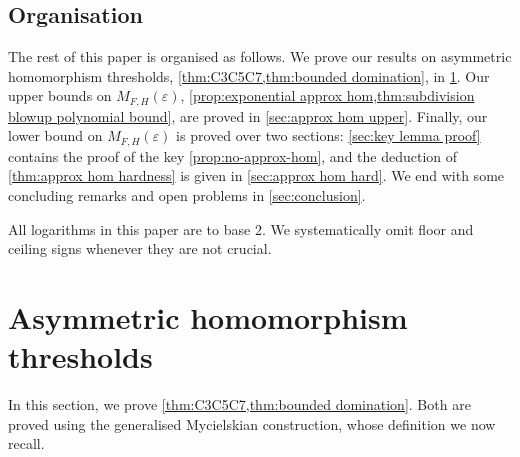 \documentclass[reqno, english, 12pt]{amsart}
\theoremstyle{plain}
\theoremstyle{remark}
\begin{document}
\subsection{Organisation}
The rest of this paper is organised as follows. We prove our results on asymmetric homomorphism thresholds, \cref{thm:C3C5C7,thm:bounded domination}, in \cref{sec:thresholds}. Our upper bounds on $M_{F,H}(\varepsilon)$, \cref{prop:exponential approx hom,thm:subdivision blowup polynomial bound}, are proved in \cref{sec:approx hom upper}. Finally, our lower bound on $M_{F,H}(\varepsilon)$ is proved over two sections: \cref{sec:key lemma proof} contains the proof of the key \cref{prop:no-approx-hom}, and the deduction of \cref{thm:approx hom hardness} is given in \cref{sec:approx hom hard}. We end with some concluding remarks and open problems in \cref{sec:conclusion}.

All logarithms in this paper are to base $2$. We systematically omit floor and ceiling signs whenever they are not crucial.


\section{Asymmetric homomorphism thresholds}\label{sec:thresholds}
In this section, we prove \cref{thm:C3C5C7,thm:bounded domination}. 
Both are proved using the generalised Mycielskian construction, whose definition we now recall.
\end{document}
